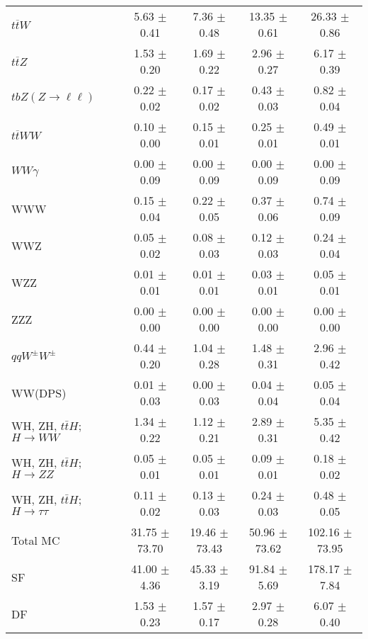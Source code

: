 \begin{tabular}{l|cccc}
                   $t\overline{t}W$ &  5.63 $\pm$  0.41 &  7.36 $\pm$  0.48 & 13.35 $\pm$  0.61 & 26.33 $\pm$  0.86 \\
                   $t\overline{t}Z$ &  1.53 $\pm$  0.20 &  1.69 $\pm$  0.22 &  2.96 $\pm$  0.27 &  6.17 $\pm$  0.39 \\
    $tbZ (Z \rightarrow \ell \ell)$ &  0.22 $\pm$  0.02 &  0.17 $\pm$  0.02 &  0.43 $\pm$  0.03 &  0.82 $\pm$  0.04 \\
                  $t\overline{t}WW$ &  0.10 $\pm$  0.00 &  0.15 $\pm$  0.01 &  0.25 $\pm$  0.01 &  0.49 $\pm$  0.01 \\
                         $WW\gamma$ &  0.00 $\pm$  0.09 &  0.00 $\pm$  0.09 &  0.00 $\pm$  0.09 &  0.00 $\pm$  0.09 \\
                                WWW &  0.15 $\pm$  0.04 &  0.22 $\pm$  0.05 &  0.37 $\pm$  0.06 &  0.74 $\pm$  0.09 \\
                                WWZ &  0.05 $\pm$  0.02 &  0.08 $\pm$  0.03 &  0.12 $\pm$  0.03 &  0.24 $\pm$  0.04 \\
                                WZZ &  0.01 $\pm$  0.01 &  0.01 $\pm$  0.01 &  0.03 $\pm$  0.01 &  0.05 $\pm$  0.01 \\
                                ZZZ &  0.00 $\pm$  0.00 &  0.00 $\pm$  0.00 &  0.00 $\pm$  0.00 &  0.00 $\pm$  0.00 \\
                 $qqW^{\pm}W^{\pm}$ &  0.44 $\pm$  0.20 &  1.04 $\pm$  0.28 &  1.48 $\pm$  0.31 &  2.96 $\pm$  0.42 \\
                            WW(DPS) &  0.01 $\pm$  0.03 &  0.00 $\pm$  0.03 &  0.04 $\pm$  0.04 &  0.05 $\pm$  0.04 \\
WH, ZH, $t\bar{t}H$; $H \rightarrow WW$ &  1.34 $\pm$  0.22 &  1.12 $\pm$  0.21 &  2.89 $\pm$  0.31 &  5.35 $\pm$  0.42 \\
WH, ZH, $t\bar{t}H$; $H \rightarrow ZZ$ &  0.05 $\pm$  0.01 &  0.05 $\pm$  0.01 &  0.09 $\pm$  0.01 &  0.18 $\pm$  0.02 \\
WH, ZH, $t\bar{t}H$; $H \rightarrow \tau\tau$ &  0.11 $\pm$  0.02 &  0.13 $\pm$  0.03 &  0.24 $\pm$  0.03 &  0.48 $\pm$  0.05 \\
\hline\hline
                           Total MC & 31.75 $\pm$ 73.70 & 19.46 $\pm$ 73.43 & 50.96 $\pm$ 73.62 & 102.16 $\pm$ 73.95 \\
\hline
                                 SF & 41.00 $\pm$  4.36 & 45.33 $\pm$  3.19 & 91.84 $\pm$  5.69 & 178.17 $\pm$  7.84 \\
                                 DF &  1.53 $\pm$  0.23 &  1.57 $\pm$  0.17 &  2.97 $\pm$  0.28 &  6.07 $\pm$  0.40 \\

\end{tabular}
